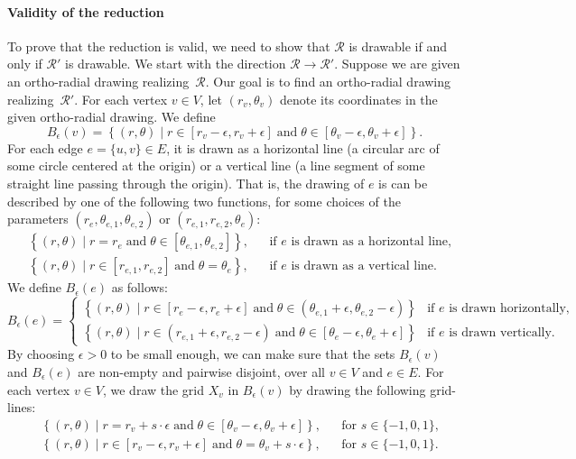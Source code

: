 \documentclass{article}\usepackage[a4paper,margin=20mm]{geometry}
\newcommand{\RR}{\mathcal{R}}
\begin{document}
\paragraph{Validity of the reduction} To prove that the reduction is valid, we need to show that $\RR$ is drawable if and only if $\RR'$ is drawable. We start with the direction $\RR \rightarrow \RR'$. Suppose we are given an ortho-radial drawing realizing~$\RR$. Our goal is to find an ortho-radial drawing realizing~$\RR'$. 
For each vertex $v \in V$, let $(r_{v}, \theta_v)$ denote its coordinates in the given ortho-radial drawing. We define 
\[B_{\epsilon}(v) = \left\{ (r, \theta) \mid r\in[r_{v} - \epsilon, r_{v} + \epsilon] \; \text{and} \; \theta \in [\theta_v - \epsilon, \theta_v + \epsilon]\right\}.\]
For each edge $e = \{u,v\} \in E$, it is drawn as a horizontal line (a circular arc of some circle centered
at the origin) or a vertical line
 (a line segment of some straight line passing through the origin). That is, the drawing of $e$ is can be described by one of the following two functions, for some choices of the parameters $(r_e, \theta_{e,1}, \theta_{e,2})$ or $(r_{e,1}, r_{e,2}, \theta_e)$:
\begin{align*}
    & \left\{ (r, \theta) \mid r= r_e \; \text{and} \; \theta \in [\theta_{e,1}, \theta_{e,2}]\right\}, && \text{if $e$ is drawn as a horizontal line,}\\
    & \left\{ (r, \theta) \mid r\in[r_{e,1}, r_{e,2}] \; \text{and} \; \theta = \theta_e\right\},  && \text{if $e$ is drawn as a vertical line.}
\end{align*}
We define $B_{\epsilon}(e)$ as follows:
\[
B_{\epsilon}(e) = 
\begin{cases}
\left\{ (r, \theta) \mid r\in[r_e - \epsilon, r_e + \epsilon] \; \text{and} \; \theta\in(\theta_{e,1} + \epsilon, \theta_{e,2} - \epsilon)\right\}
& \text{if $e$ is drawn horizontally,}\\
\left\{ (r, \theta) \mid r\in(r_{e,1} + \epsilon, r_{e,2} - \epsilon) \; \text{and} \; \theta \in [\theta_e - \epsilon, \theta_e + \epsilon]\right\}
& \text{if $e$ is drawn vertically.}
\end{cases}
\]
By choosing $\epsilon > 0$ to be small enough, we can make sure that the sets $B_\epsilon(v)$ and $B_\epsilon(e)$ are non-empty and pairwise disjoint, over all $v\in V$ and $e\in E$. For each vertex $v\in V$, we draw the grid $X_v$ in $B_\epsilon(v)$ by drawing the following grid-lines:
\begin{align*}
    & \left\{ (r, \theta) \mid r= r_v +  s \cdot \epsilon \; \text{and} \; \theta \in [\theta_v - \epsilon, \theta_v + \epsilon]\right\},  && \text{for $s \in \{-1, 0, 1\}$,}\\
    & \left\{ (r, \theta) \mid r\in[r_{v} - \epsilon, r_{v} + \epsilon] \; \text{and} \; \theta = \theta_v + s \cdot \epsilon \right\},  && \text{for $s \in \{-1, 0, 1\}$.}
\end{align*}
\end{document}
